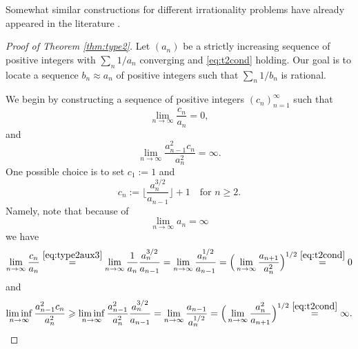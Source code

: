 \documentclass[11pt,letterpaper,reqno]{amsart}
\numberwithin{equation}{section}
\theoremstyle{definition}
\numberwithin{equation}{section}
\begin{document}
Somewhat similar constructions for different irrationality problems have already appeared in the literature \cite{Han91,TY02,HT04}.

\begin{proof}[Proof of Theorem \ref{thm:type2}]
Let $(a_n)$ be a strictly increasing sequence of positive integers with $\sum_n 1/a_n$ converging and \eqref{eq:t2cond} holding. Our goal is to locate a sequence $b_n \approx a_n$ of positive integers such that $\sum_n 1/b_n$ is rational.

We begin by constructing a sequence of positive integers $(c_n)_{n=1}^{\infty}$ such that
\begin{equation}\label{eq:type2aux1}
\lim_{n\to\infty}\frac{c_n}{a_n} = 0,
\end{equation}
and
\begin{equation}\label{eq:type2aux2}
\lim_{n\to\infty}\frac{a_{n-1}^2 c_n}{a_n^2} = \infty.
\end{equation}
One possible choice is to set $c_1:=1$ and
\[ c_n := \Big\lfloor \frac{a_n^{3/2}}{a_{n-1}} \Big\rfloor+1 \quad\text{for } n\geqslant 2. \]
Namely, note that because of
\begin{equation}\label{eq:type2aux3}
\lim_{n\to\infty}a_n=\infty
\end{equation}
we have
\[ \lim_{n\to\infty}\frac{c_n}{a_n}
\stackrel{\eqref{eq:type2aux3}}{=} \lim_{n\to\infty} \frac{1}{a_n} \frac{a_n^{3/2}}{a_{n-1}}
= \lim_{n\to\infty}\frac{a_n^{1/2}}{a_{n-1}}
= \Big(\lim_{n\to\infty}\frac{a_{n+1}}{a_{n}^2}\Big)^{1/2} \stackrel{\eqref{eq:t2cond}}{=} 0 \]
and
\[ \liminf_{n\to\infty}\frac{a_{n-1}^2 c_n}{a_n^2}
\geqslant \liminf_{n\to\infty}\frac{a_{n-1}^2}{a_n^2} \frac{a_n^{3/2}}{a_{n-1}}
= \lim_{n\to\infty}\frac{a_{n-1}}{a_n^{1/2}}
= \Big(\lim_{n\to\infty}\frac{a_{n}^2}{a_{n+1}}\Big)^{1/2} \stackrel{\eqref{eq:t2cond}}{=} \infty. \]


\end{proof}
\end{document}
